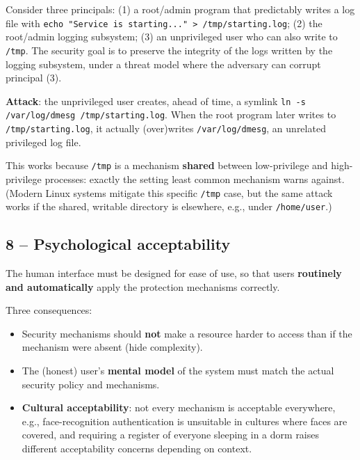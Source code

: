 \begin{example}
Consider three principals: (1) a root/admin program that predictably writes a log file with \texttt{echo "Service is starting..." > /tmp/starting.log}; (2) the root/admin logging subsystem; (3) an unprivileged user who can also write to \texttt{/tmp}. The security goal is to preserve the integrity of the logs written by the logging subsystem, under a threat model where the adversary can corrupt principal (3).

\textbf{Attack}: the unprivileged user creates, ahead of time, a symlink \verb|ln -s /var/log/dmesg /tmp/starting.log|. When the root program later writes to \texttt{/tmp/starting.log}, it actually (over)writes \texttt{/var/log/dmesg}, an unrelated privileged log file.

This works because \texttt{/tmp} is a mechanism \textbf{shared} between low-privilege and high-privilege processes: exactly the setting least common mechanism warns against. (Modern Linux systems mitigate this specific \texttt{/tmp} case, but the same attack works if the shared, writable directory is elsewhere, e.g., under \texttt{/home/user}.)
\end{example}

\subsection{8 -- Psychological acceptability}

\begin{definition}
The human interface must be designed for ease of use, so that users \textbf{routinely and automatically} apply the protection mechanisms correctly.
\end{definition}

Three consequences:
\begin{itemize}
    \item Security mechanisms should \textbf{not} make a resource harder to access than if the mechanism were absent (hide complexity).
    \item The (honest) user's \textbf{mental model} of the system must match the actual security policy and mechanisms.
    \item \textbf{Cultural acceptability}: not every mechanism is acceptable everywhere, e.g., face-recognition authentication is unsuitable in cultures where faces are covered, and requiring a register of everyone sleeping in a dorm raises different acceptability concerns depending on context.
\end{itemize}

